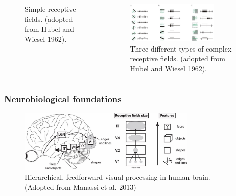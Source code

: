 \documentclass[a4paper,9pt]{beamer}
\theoremstyle{mytheoremstyle}
\begin{document}
\begin{frame}
\begin{columns}
\begin{figure}
\begin{center}
\end{center}
	\caption{Simple receptive fields. (adopted from Hubel and Wiesel 1962).}
\end{figure}
\vspace{0.2cm}
\begin{figure}
\begin{center}
  \includegraphics[width=0.75\textwidth]{res/complex_cells.png}
\end{center}
	\caption{Three different types of complex receptive fields. (adopted from Hubel and Wiesel 1962).}
\end{figure}
\end{columns}
\end{frame}

\begin{frame}
\frametitle{Neurobiological foundations}
\begin{figure}
\begin{center}
  \includegraphics[width=0.75\textwidth]{res/human_vision.png}
\end{center}
	\caption{Hierarchical, feedforward visual processing in human brain. (Adopted from Manassi et al. 2013)}
\end{figure}
\end{frame}
\end{document}
